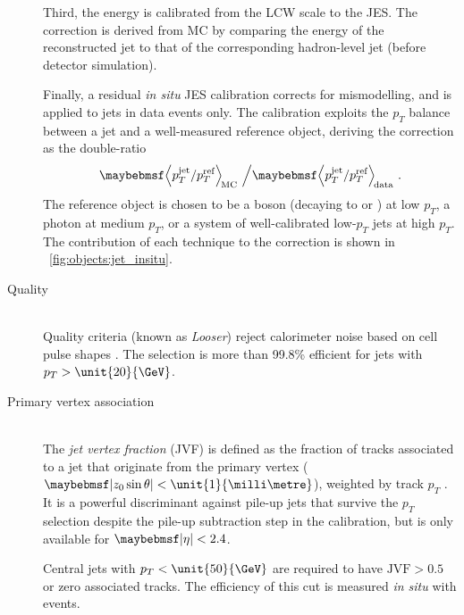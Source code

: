\begin{description}
	Third, the energy is calibrated from the LCW scale to the \ac{JES}. The correction is 
	derived from MC by comparing the energy of the reconstructed jet to that of the 
	corresponding hadron-level jet (\ie before detector simulation).

	Finally, a residual \textit{in situ} \ac{JES} calibration corrects for mismodelling, 
	and is applied to jets in data events only. The calibration exploits the $p_T$ 
	balance between a jet and a well-measured reference object, deriving the correction 
	as the double-ratio
	\begin{equation}
		\angles{p_T^{\text{jet}} / p_T^{\text{ref}}}_{\text{\!MC}} \,\, \Big/ 
		\angles{p_T^{\text{jet}} / p_T^{\text{ref}}}_{\text{\!data}} \,\,.
	\end{equation}
	The reference object is chosen to be a \PZ boson (decaying to \epluseminus or 
	\HepProcess{\APmuon\Pmuon}) at low $p_T$, a photon at medium $p_T$, or a system of 
	well-calibrated low-$p_T$ jets at high $p_T$. The contribution of each technique to 
	the correction is shown in \Figure~\ref{fig:objects:jet_insitu}.
\item[Quality] \hfill \\
	Quality criteria (known as \textit{Looser}) reject calorimeter noise based on cell 
	pulse shapes \cite{Jets:Quality:2011}. The selection is more than 99.8\% efficient 
	for jets with $p_T > \unit{20}{\GeV}$.
\item[Primary vertex association] \hfill \\
	The \textit{jet vertex fraction} (JVF) is defined as the fraction of tracks 
	associated to a jet that originate from the primary vertex ($\mods{z_0 \sin\theta} < 
	\unit{1}{\milli\metre}$), weighted by track $p_T$ \cite{Jets:PileupCorrection:2012}. 
	It is a powerful discriminant against pile-up jets that survive the $p_T$ selection 
	despite the pile-up subtraction step in the calibration, but is only available for 
	$\mods{\eta} < 2.4$.

	Central jets with $p_T < \unit{50}{\GeV}$ are required to have $\text{JVF} > 0.5$ or 
	zero associated tracks. The efficiency of this cut is measured \textit{in situ} with 
	\Zjets events.
\end{description}

